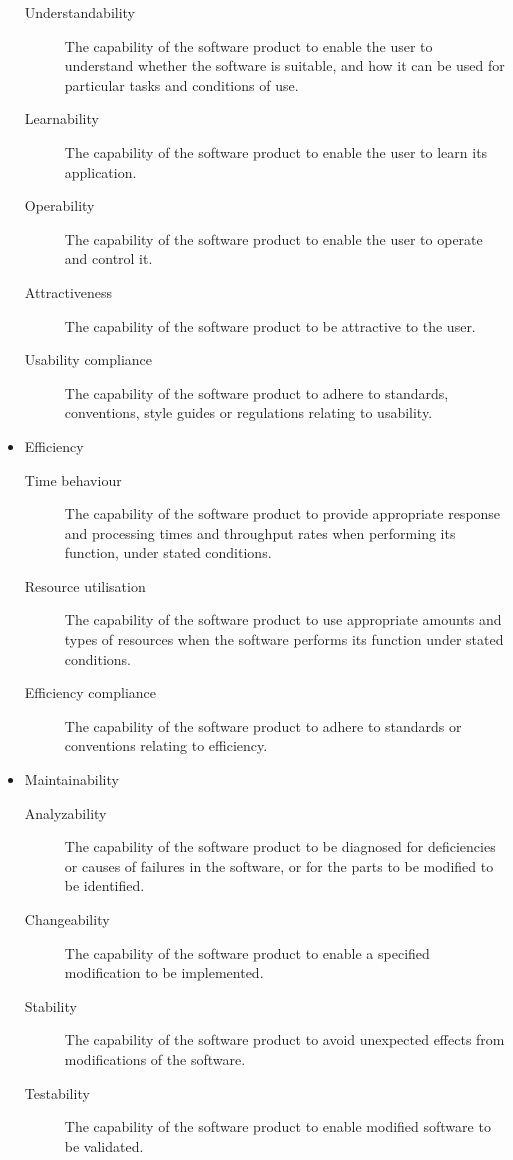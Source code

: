 \begin{itemize}
\begin{description}
              \item[Understandability] The capability of the software product to enable the user to understand whether the software is suitable, and how it can be used for particular tasks and conditions of use.
              \item[Learnability] The capability of the software product to enable the user to learn its application.
              \item[Operability] The capability of the software product to enable the user to operate and control it.
              \item[Attractiveness] The capability of the software product to be attractive to the user.
              \item[Usability compliance] The capability of the software product to adhere to standards, conventions, style guides or regulations relating to usability.
            \end{description}
      \item Efficiency
        \begin{description}
              \item[Time behaviour] The capability of the software product to provide appropriate response and processing times and throughput rates when performing its function, under stated conditions.
              \item[Resource utilisation] The capability of the software product to use appropriate amounts and types of resources when the software performs its function under stated conditions.
              \item[Efficiency compliance] The capability of the software product to adhere to standards or conventions relating to efficiency.
            \end{description}
      \item Maintainability
        \begin{description}
              \item[Analyzability] The capability of the software product to be diagnosed for deficiencies or causes of failures in the software, or for the parts to be modified to be identified.
              \item[Changeability] The capability of the software product to enable a specified modification to be implemented.
              \item[Stability] The capability of the software product to avoid unexpected effects from modifications of the software.
              \item[Testability] The capability of the software product to enable modified software to be validated.

\end{description}
\end{itemize}
